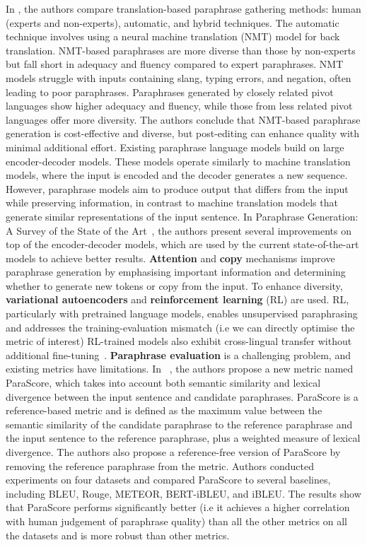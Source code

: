 \documentclass[fleqn,moreauthors,10pt]{ds_report}
\begin{document}
In \cite{federmann-etal-2019-multilingual}, the authors compare translation-based paraphrase gathering methods: human (experts and non-experts), automatic, and hybrid techniques. The automatic technique involves using a neural machine translation (NMT) model for back translation. NMT-based paraphrases are more diverse than those by non-experts but fall short in adequacy and fluency compared to expert paraphrases. NMT models struggle with inputs containing slang, typing errors, and negation, often leading to poor paraphrases. Paraphrases generated by closely related pivot languages show higher adequacy and fluency, while those from less related pivot languages offer more diversity. The authors conclude that NMT-based paraphrase generation is cost-effective and diverse, but post-editing can enhance quality with minimal additional effort. Existing paraphrase language models build on large encoder-decoder models. These models operate similarly to machine translation models, where the input is encoded and the decoder generates a new sequence. However, paraphrase models aim to produce output that differs from the input while preserving information, in contrast to machine translation models that generate similar representations of the input sentence. In {Paraphrase Generation: A Survey of the State of the Art}~\cite{zhou-bhat-2021-paraphrase}, the authors present several improvements on top of the encoder-decoder models, which are used by the current state-of-the-art models to achieve better results. \textbf{Attention} and \textbf{copy} mechanisms improve paraphrase generation by emphasising important information and determining whether to generate new tokens or copy from the input. To enhance diversity, \textbf{variational autoencoders} and \textbf{reinforcement learning} (RL) are used. RL, particularly with pretrained language models, enables unsupervised paraphrasing and addresses the training-evaluation mismatch (i.e we can directly optimise the metric of interest) RL-trained models also exhibit cross-lingual transfer without additional fine-tuning~\cite{DBLP:journals/corr/abs-2010-12885}. \textbf{Paraphrase evaluation} is a challenging problem, and existing metrics have limitations. In ~\cite{evaluation-metrics-in-paraphrase-generation}, the authors propose a new metric named ParaScore, which takes into account both semantic similarity and lexical divergence between the input sentence and candidate paraphrases. ParaScore is a reference-based metric and is defined as the maximum value between the semantic similarity of the candidate paraphrase to the reference paraphrase and the input sentence to the reference paraphrase, plus a weighted measure of lexical divergence. The authors also propose a reference-free version of ParaScore by removing the reference paraphrase from the metric. Authors conducted experiments on four datasets and compared ParaScore to several baselines, including BLEU, Rouge, METEOR, BERT-iBLEU, and iBLEU. The results show that ParaScore performs significantly better (i.e it achieves a higher correlation with human judgement of paraphrase quality) than all the other metrics on all the datasets and is more robust than other metrics. 
\end{document}
